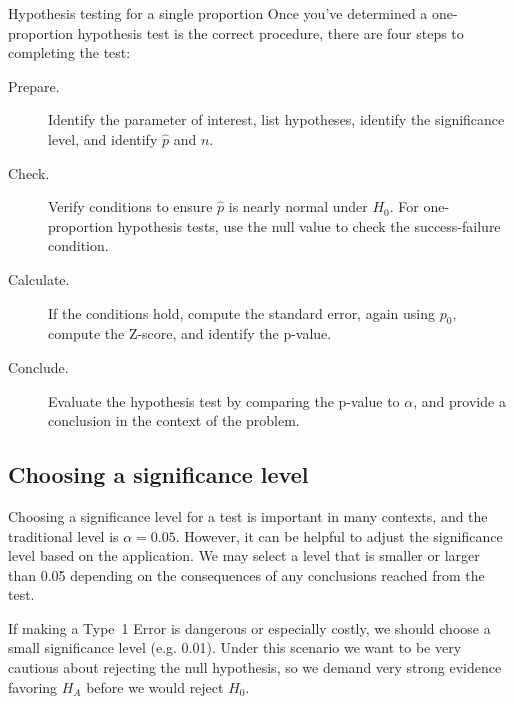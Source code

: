 
\newcommand{\oneprophtsummary}{
\begin{onebox}{Hypothesis testing for a single proportion}
  Once you've determined a one-proportion hypothesis test is the
  correct procedure, there are four steps to completing the
  test:
  \begin{description}
  \item[Prepare.]
      Identify the parameter of interest,
      list hypotheses,
      identify the significance level,
      and identify $\hat{p}$ and $n$.
  \item[Check.]
      Verify conditions
      to ensure $\hat{p}$ is nearly normal under $H_0$.
      For one-proportion hypothesis tests, use the null
      value to check the success-failure condition.
  \item[Calculate.]
      If the conditions hold, compute the standard
      error, again using $p_0$, compute the Z-score,
      and identify the p-value.
  \item[Conclude.]
      Evaluate the hypothesis test by comparing the p-value
      to $\alpha$, and provide a conclusion in the context
      of the problem.
  \end{description}
\end{onebox}
}
\oneprophtsummary{}



\subsection{Choosing a significance level}
\label{significanceLevel}


Choosing a significance level for a test is important in
many contexts, and the traditional level is $\alpha = 0.05$.
However, it can be helpful to adjust the significance level
based on the application. We may select a level that is
smaller or larger than 0.05 depending on the consequences
of any conclusions reached from the test.

If making a Type~1 Error is dangerous or especially costly,
we should choose a small significance level (e.g. 0.01).
Under this scenario we want to be very cautious about
rejecting the null hypothesis, so we demand very strong
evidence favoring $H_A$ before we would reject $H_0$.

